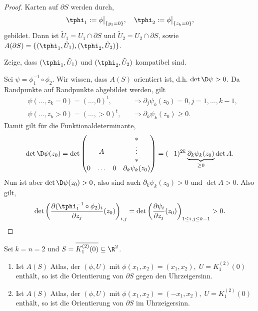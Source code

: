 \begin{proof}
Karten auf $\partial S$ werden durch,
\begin{align*}
\tphi_1 := \phi\big|_{\{y_1 = 0\}},\quad \tphi_2 := \phi\big|_{\{z_k = 0\}},
\end{align*}
gebildet. Dann ist $\tilde{U}_1 = U_1\cap \partial S$ und $\tilde{U}_2 = U_2\cap
\partial S$, sowie $A(\partial S) = \{(\tphi_1,\tilde{U}_1),
(\tphi_2,\tilde{U}_2)\}$.

Zeige, dass $(\tphi_1,\tilde{U}_1)$ und $(\tphi_2,\tilde{U}_2)$ kompatibel
sind.

Sei $\psi = \phi_1^{-1}\circ\phi_2$.  Wir wissen, dass $A(S)$ orientiert ist,
d.h. $\det \D\psi > 0$. Da Randpunkte auf Randpunkte abgebildet werden, gilt
\begin{align*}
&\psi(\ldots,z_k=0) = (\ldots,0)^t, &&\Rightarrow \partial_j \psi_k(z_0) = 0, j
= 1,\ldots,k-1,\\
&\psi(\ldots,z_k>0) = (\ldots,>0)^t, &&\Rightarrow \partial_k \psi_k(z_0) \ge 0.
\end{align*}
Damit gilt für die Funktionaldeterminante,
\begin{align*}
\det \D\psi(z_0) = \det \begin{pmatrix}
& & & *\\ 
& A & & \vdots\\
& & & *\\
0 & \ldots & 0 & \partial_k \psi_k(z_0)\\
\end{pmatrix}
= (-1)^{2k} \underbrace{\partial_k \psi_k(z_0)}_{\ge 0} \det A.
\end{align*}
Nun ist aber $\det\D\psi(z_0)>0$, also sind auch $\partial_k \psi_k(z_0)>0$ und
$\det A >0$. Also gilt,
\begin{align*}
\det \left(\frac{\partial(\tphi_1^{-1}\circ\phi_2)_i}{\partial z_j}(z_0)
\right)_{i,j} = \det \left(\frac{\partial\psi_i}{\partial
z_j}(z_0) \right)_{1\le i,j \le k-1} > 0.\qedhere
\end{align*}
\end{proof}

\begin{bsp}
\label{bsp:4.13}
Sei $k=n=2$ und $S=\overline{K_1^{(2)}(0)}\subseteq\R^2$.
\begin{enumerate}[label=(\roman{*})]
  \item Ist $A(S)$ Atlas, der $(\phi,U)$ mit $\phi(x_1,x_2) = (x_1,x_2),\; U =
  K_1^{(2)}(0)$ enthält, so ist die Orientierung von $\partial S$ gegen
  den Uhrzeigersinn.
  \item Ist $A(S)$ Atlas, der $(\phi,U)$ mit $\phi(x_1,x_2) = (-x_1,x_2),\; U =
  K_1^{(2)}(0)$ enthält, so ist die Orientierung von $\partial S$ im Uhrzeigersinn.
\hfill\bsphere 
\end{enumerate}
\end{bsp}

